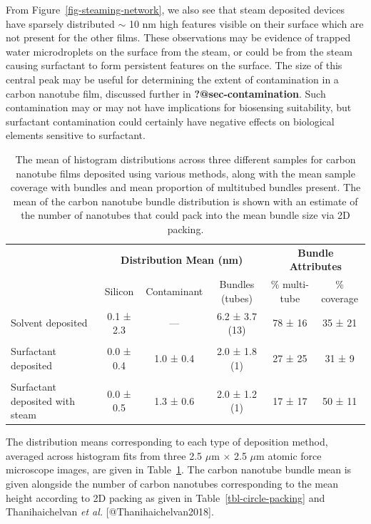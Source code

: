 \documentclass[
  letterpaper,
  DIV=11,
  numbers=noendperiod]{scrartcl}
\begin{document}
From Figure~\ref{fig-steaming-network}, we also see that steam deposited
devices have sparsely distributed \(\sim\) 10 nm high features visible
on their surface which are not present for the other films. These
observations may be evidence of trapped water microdroplets on the
surface from the steam, or could be from the steam causing surfactant to
form persistent features on the surface. The size of this central peak
may be useful for determining the extent of contamination in a carbon
nanotube film, discussed further in \textbf{?@sec-contamination}. Such
contamination may or may not have implications for biosensing
suitability, but surfactant contamination could certainly have negative
effects on biological elements sensitive to surfactant.

\hypertarget{tbl-histogram-parameters}{}
\begin{table}
\caption{\label{tbl-histogram-parameters}The mean of histogram distributions across three different samples for
carbon nanotube films deposited using various methods, along with the
mean sample coverage with bundles and mean proportion of multitubed
bundles present. The mean of the carbon nanotube bundle distribution is
shown with an estimate of the number of nanotubes that could pack into
the mean bundle size via 2D packing. }\tabularnewline

\centering
\begin{tabular}{>{\raggedright\arraybackslash}p{2cm}ccccc}
\toprule
\multicolumn{1}{c}{\textbf{ }} & \multicolumn{3}{c}{\textbf{Distribution Mean (nm)}} & \multicolumn{2}{c}{\textbf{Bundle Attributes}} \\
\cmidrule(l{3pt}r{3pt}){2-4} \cmidrule(l{3pt}r{3pt}){5-6}
 & Silicon & Contaminant & Bundles (tubes) & \% multi-tube & \% coverage\\
\midrule
Solvent deposited & 0.1 ± 2.3 & — & 6.2 ± 3.7 (13) & 78 ± 16 & 35 ± 21\\
 &  &  &  &  \vphantom{1} & \\
Surfactant deposited & 0.0 ± 0.4 & 1.0 ± 0.4 & 2.0 ± 1.8 (1) & 27 ± 25 & 31 ± 9\\
 &  &  &  &  & \\
Surfactant deposited with steam & 0.0 ± 0.5 & 1.3 ± 0.6 & 2.0 ± 1.2 (1) & 17 ± 17 & 50 ± 11\\
\bottomrule
\end{tabular}
\end{table}

The distribution means corresponding to each type of deposition method,
averaged across histogram fits from three 2.5 \(\mu\)m \(\times\) 2.5
\(\mu\)m atomic force microscope images, are given in
Table~\ref{tbl-histogram-parameters}. The carbon nanotube bundle mean is
given alongside the number of carbon nanotubes corresponding to the mean
height according to 2D packing as given in
Table~\ref{tbl-circle-packing} and Thanihaichelvan \emph{et al.}
{[}@Thanihaichelvan2018{]}.
\end{document}
